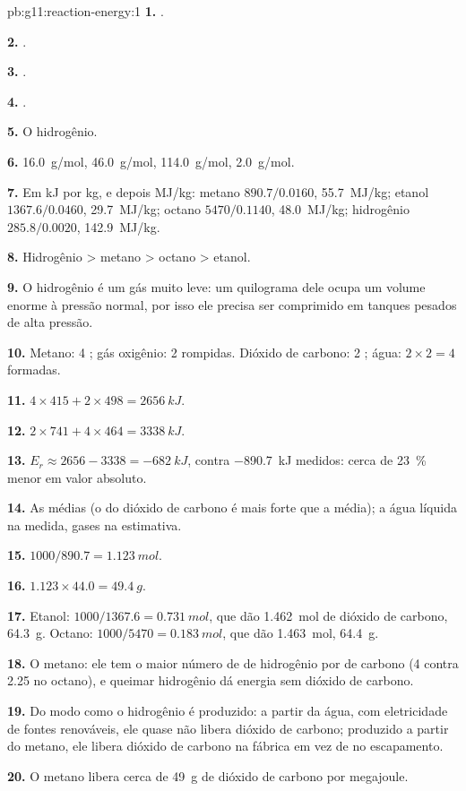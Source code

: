 \begin{solution}{pb:g11:reaction-energy:1}
\textbf{1.} .

\textbf{2.} .

\textbf{3.} .

\textbf{4.} .

\textbf{5.} O hidrogênio.

\textbf{6.} \qty{16.0}{g/mol}, \qty{46.0}{g/mol}, \qty{114.0}{g/mol},
\qty{2.0}{g/mol}.

\textbf{7.} Em \si{kJ} por \si{kg}, e depois \si{MJ/kg}: metano
$890.7 / 0.0160$, \qty{55.7}{MJ/kg}; etanol $1367.6 / 0.0460$,
\qty{29.7}{MJ/kg}; octano $5470 / 0.1140$, \qty{48.0}{MJ/kg}; hidrogênio
$285.8 / 0.0020$, \qty{142.9}{MJ/kg}.

\textbf{8.} Hidrogênio > metano > octano > etanol.

\textbf{9.} O hidrogênio é um gás muito leve: um quilograma dele ocupa
um volume enorme à pressão normal, por isso ele precisa ser comprimido
em tanques pesados de alta pressão.

\textbf{10.} Metano: 4 ; gás oxigênio: 2  rompidas.
Dióxido de carbono: 2 ; água: $2 \times 2 = 4$ 
formadas.

\textbf{11.} $4 \times 415 + 2 \times 498 = \qty{2656}{kJ}$.

\textbf{12.} $2 \times 741 + 4 \times 464 = \qty{3338}{kJ}$.

\textbf{13.} $E_r \approx 2656 - 3338 = \qty{-682}{kJ}$, contra
\qty{-890.7}{kJ} medidos: cerca de \qty{23}{\percent} menor em valor
absoluto.

\textbf{14.} As  médias (o  do dióxido de
carbono é mais forte que a média); a água líquida na medida, gases na
estimativa.

\textbf{15.} $1000 / 890.7 = \qty{1.123}{mol}$.

\textbf{16.} $1.123 \times 44.0 = \qty{49.4}{g}$.

\textbf{17.} Etanol: $1000 / 1367.6 = \qty{0.731}{mol}$, que dão
\qty{1.462}{mol} de dióxido de carbono, \qty{64.3}{g}. Octano:
$1000 / 5470 = \qty{0.183}{mol}$, que dão \qty{1.463}{mol},
\qty{64.4}{g}.

\textbf{18.} O metano: ele tem o maior número de  de hidrogênio
por  de carbono (4 contra 2.25 no octano), e queimar hidrogênio dá
energia sem dióxido de carbono.

\textbf{19.} Do modo como o hidrogênio é produzido: a partir da água,
com eletricidade de fontes renováveis, ele quase não libera dióxido de
carbono; produzido a partir do metano, ele libera dióxido de carbono na
fábrica em vez de no escapamento.

\textbf{20.} O metano libera cerca de \qty{49}{g} de dióxido de carbono
por megajoule.
\end{solution}
